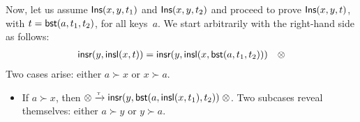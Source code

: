 Now, let us assume \(\textsf{Ins}({x,y,t_1})\) and \(\textsf{Ins}({x,y,t_2})\)
and proceed to prove \(\textsf{Ins}({x,y,t})\), with
\(t=\textsf{bst}(a,t_1,t_2)\), for all keys~\(a\). We start arbitrarily
with the right\hyp{}hand side as follows:
\begin{equation*}
\begin{array}{@{}r@{\;}l@{\;}l@{\quad}r@{}}
  \fun{insr}(y,\fun{insl}(x,t))
& = & \fun{insr}(y,\fun{insl}(x,\fun{bst}(a,t_1,t_2))) & \otimes
\end{array}
\end{equation*}
Two cases arise: either \(a \succ x\) or \(x \succ a\).
\begin{itemize}

\item If \(a \succ x\), then \(\otimes \xrightarrow{\smash{\tau}}
  \textsf{insr}(y,\textsf{bst}(a,\textsf{insl}(x,t_1),t_2)) \; \otimes\). Two
  subcases reveal themselves: either \(a \succ y\) or \(y \succ a\).
  \begin{itemize}


\end{itemize}
\end{itemize}
